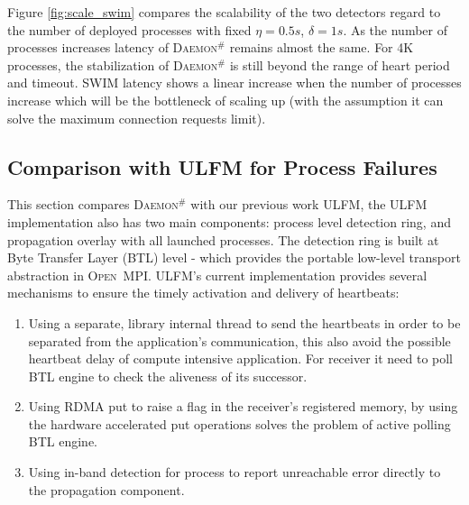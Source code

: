 \documentclass[sigconf]{acmart}
\newcommand{\ompi}[0]{\textsc{Open~MPI}\xspace}
\newcommand{\ulfm}[0]{\textsc{ULFM}\xspace}
\newcommand{\ourwork}[0]{\textsc{Daemon}\ensuremath{^\#}\xspace}
\begin{document}
Figure \ref{fig:scale_swim} compares the scalability of the two detectors regard to the number of deployed processes with fixed  $\eta = 0.5s$, $\delta = 1s$. 
As the number of processes increases latency of \ourwork remains almost the same. 
For 4K processes, the stabilization of \ourwork is still beyond the range of heart period and timeout.
SWIM latency shows a linear increase when the number of processes increase which will be the bottleneck of scaling up (with the assumption it can solve the maximum connection requests limit). 


\subsection{Comparison with \ulfm for Process Failures}
This section compares \ourwork with our previous work \ulfm, the \ulfm implementation also has two main components: process level detection ring, and propagation overlay with all launched processes. The detection ring is built at Byte Transfer Layer (BTL) level - which provides the portable low-level transport abstraction in \ompi. \ulfm's current implementation provides several mechanisms to ensure the timely activation and delivery of heartbeats:
\begin{enumerate}
  \item Using a separate, library internal thread to send the heartbeats in order to be separated from the application's communication, this also avoid the possible heartbeat delay of compute intensive application. For receiver it need to poll BTL engine to check the aliveness of its successor. 
  \item Using RDMA put to raise a flag in the receiver's registered memory, by using the hardware accelerated put operations solves the problem of active polling BTL engine. 
  \item Using in-band detection for process to report unreachable error directly to the propagation component.
\end{enumerate}
\end{document}
